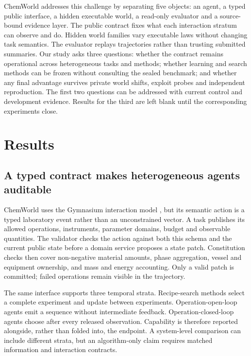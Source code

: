 \documentclass[11pt]{article}
\begin{document}
ChemWorld addresses this challenge by separating five objects: an agent, a typed public interface, a hidden executable world, a read-only evaluator and a source-bound evidence layer. The public contract fixes what each interaction stratum can observe and do. Hidden world families vary executable laws without changing task semantics. The evaluator replays trajectories rather than trusting submitted summaries. Our study asks three questions: whether the contract remains operational across heterogeneous tasks and methods; whether learning and search methods can be frozen without consulting the sealed benchmark; and whether any final advantage survives private world shifts, exploit probes and independent reproduction. The first two questions can be addressed with current control and development evidence. Results for the third are left blank until the corresponding experiments close.

\section*{Results}

\subsection*{A typed contract makes heterogeneous agents auditable}

ChemWorld uses the Gymnasium interaction model \citep{towers2024gymnasium}, but its semantic action is a typed laboratory event rather than an unconstrained vector. A task publishes its allowed operations, instruments, parameter domains, budget and observable quantities. The validator checks the action against both this schema and the current public state before a domain service proposes a state patch. Constitution checks then cover non-negative material amounts, phase aggregation, vessel and equipment ownership, and mass and energy accounting. Only a valid patch is committed; failed operations remain visible in the trajectory.

The same interface supports three temporal strata. Recipe-search methods select a complete experiment and update between experiments. Operation-open-loop agents emit a sequence without intermediate feedback. Operation-closed-loop agents choose after every released observation. Capability is therefore reported alongside, rather than folded into, the endpoint. A system-level comparison can include different strata, but an algorithm-only claim requires matched information and interaction contracts.
\end{document}
